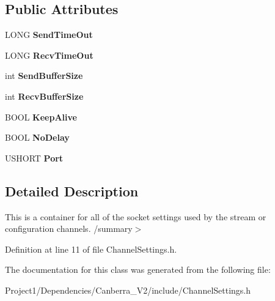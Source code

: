 \subsection*{Public Attributes}
\begin{DoxyCompactItemize}
\item 
\mbox{\label{class_canberra_1_1_protocols_1_1_lynx_1_1_channel_settings_ab32822a76478a6d741f71222c30b30c6}} 
L\+O\+NG {\bfseries Send\+Time\+Out}
\item 
\mbox{\label{class_canberra_1_1_protocols_1_1_lynx_1_1_channel_settings_ad42c2f50bc5ef530aa0ab827217a9ae3}} 
L\+O\+NG {\bfseries Recv\+Time\+Out}
\item 
\mbox{\label{class_canberra_1_1_protocols_1_1_lynx_1_1_channel_settings_a610abd3240b1505fe8f230fa100ab2b2}} 
int {\bfseries Send\+Buffer\+Size}
\item 
\mbox{\label{class_canberra_1_1_protocols_1_1_lynx_1_1_channel_settings_a8851db22e225b3c6a5fa6868331bcfe4}} 
int {\bfseries Recv\+Buffer\+Size}
\item 
\mbox{\label{class_canberra_1_1_protocols_1_1_lynx_1_1_channel_settings_a25940ad2e705a38284928f5be6013d3f}} 
B\+O\+OL {\bfseries Keep\+Alive}
\item 
\mbox{\label{class_canberra_1_1_protocols_1_1_lynx_1_1_channel_settings_a3ca60f1003d0529081ea79aab86fdf13}} 
B\+O\+OL {\bfseries No\+Delay}
\item 
\mbox{\label{class_canberra_1_1_protocols_1_1_lynx_1_1_channel_settings_a623dc557331c8f472a52e438dd63c290}} 
U\+S\+H\+O\+RT {\bfseries Port}
\end{DoxyCompactItemize}


\subsection{Detailed Description}
This is a container for all of the socket settings used by the stream or configuration channels. /summary$>$ 

Definition at line 11 of file Channel\+Settings.\+h.



The documentation for this class was generated from the following file\+:\begin{DoxyCompactItemize}
\item 
Project1/\+Dependencies/\+Canberra\+\_\+\+V2/include/Channel\+Settings.\+h\end{DoxyCompactItemize}

